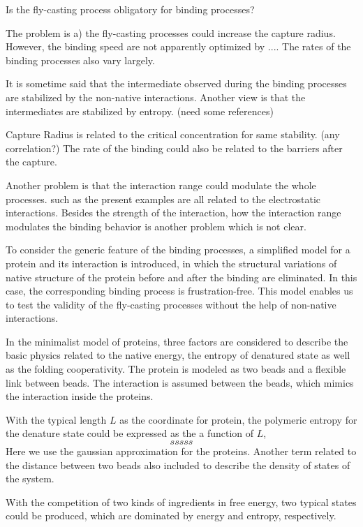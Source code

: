 \documentclass[preprint,preprintnumbers,amsmath,amssymb,showpacs,aps,pre]{revtex4-1}
\begin{document}
Is the fly-casting process obligatory for binding processes?

The problem is a) the fly-casting processes could increase the 
capture radius. However, the binding speed are not apparently
optimized by .... The rates of the binding processes also vary
largely.

It is sometime said that the intermediate observed during the
binding processes are stabilized by the non-native interactions.
Another view is that the intermediates are stabilized by entropy.
(need some references)

Capture Radius is related to the critical concentration for same
stability. (any correlation?) The rate of the binding could also
be related to the barriers after the capture.

Another problem is that the interaction range could modulate the
whole processes. such as the present examples are all related to
the electrostatic interactions. Besides the strength of the interaction,
how the interaction range modulates the binding behavior is another
problem which is not clear.

To consider the generic feature of the binding processes,
a simplified model for a protein and its interaction is introduced,
in which the structural variations of native structure of the protein
before and after the binding are eliminated. In this case, the
corresponding binding process is frustration-free. This model
enables us to test the validity of the fly-casting processes without
the help of non-native interactions.

In the minimalist model of proteins, three factors are considered to describe
the basic physics related to the native energy, the entropy of denatured
state as well as the folding cooperativity. The protein is modeled as
two beads and a flexible link between beads. The interaction is assumed
between the beads, which mimics the interaction inside the proteins.

With the typical length $L$ as the coordinate for protein, the polymeric
entropy for the denature state could be expressed as the a function of $L$,
\begin{equation}
sssss
\end{equation}
Here we use the gaussian approximation for the proteins. Another term
related to the distance between two beads also included to describe the
density of states of the system.

With the competition of two kinds of ingredients in free energy, two typical
states could be produced, which are dominated by energy and entropy,
respectively.
\end{document}
